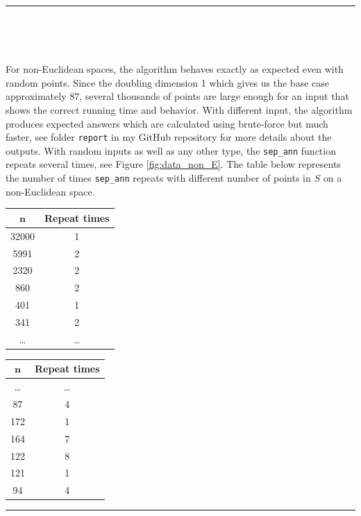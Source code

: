 \documentclass[12pt,english,]{article}
\newcommand{\code}[1]{\colorbox{light-gray}{\texttt{#1}}}
\let\origfigure\figure
\let\endorigfigure\endfigure
\renewenvironment{figure}[1][2] {
    \expandafter\origfigure\expandafter[H]
} {
    \endorigfigure
}
\begin{document}
\hrule

~

~

For non-Euclidean spaces, the algorithm behaves exactly as expected even
with random points. Since the doubling dimension 1 which gives us the
base case approximately \(87\), several thousands of points are large
enough for an input that shows the correct running time and behavior.
With different input, the algorithm produces expected answers which are
calculated using brute-force but much faster, see folder \code{report}
in my GitHub repository for more details about the outputs. With random
inputs as well as any other type, the \code{sep\_ann} function repeats
several times, see Figure \ref{fig:data_non_E}. The table below
represents the number of times \code{sep\_ann} repeats with different
number of points in \(S\) on a non-Euclidean space.

\begin{figure}
\begin{minipage}{0.48\textwidth}
  \centering
  \begin{tabular}{|c|c|}
  \hline
  $\boldsymbol n$   & \textbf{Repeat times} \\ \hline
   32000  & 1            \\ \hline
   5991   & 2            \\ \hline
   2320   & 2            \\ \hline
   860    & 2            \\ \hline
   401    & 1           \\ \hline
   341    & 2            \\ \hline
  \ldots   & \ldots       \\ \hline
  \end{tabular}
\end{minipage}
\begin{minipage}{0.48\textwidth}
  \centering
  \begin{tabular}{|c|c|}
  \hline
  $\boldsymbol n$   & \textbf{Repeat times} \\ \hline
  \ldots   & \ldots       \\ \hline
   87      & 4            \\ \hline
   172     & 1            \\ \hline
   164     & 7            \\ \hline
   122     & 8            \\ \hline
   121     & 1            \\ \hline
   94      & 4            \\ \hline
  \end{tabular}
\end{minipage}
\caption[Caption]{Given an input of $32\,000$ points generated randomly in a non-Euclidean metric space. This is a portion of the data about the number of times the algorithm \textsc{SepAnn$(S,n,d,\mu,c)$} repeats.}
\label{fig:data_non_E}
\end{figure}
\hrule
\end{document}
